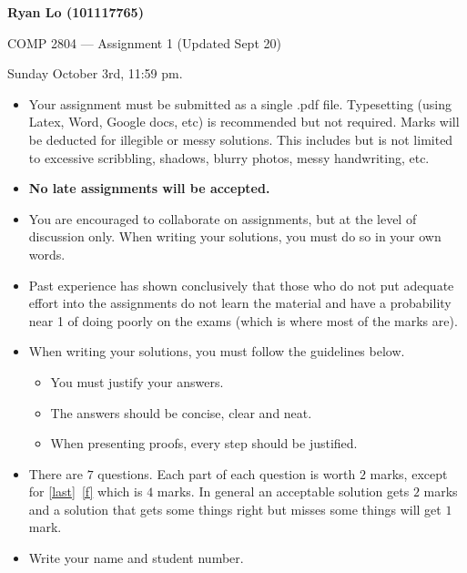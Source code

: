 \documentclass[12pt]{article}
\newcounter{ques}
\newenvironment{question}{\refstepcounter{ques}{\noindent\bf Question \arabic{ques}:}}{\vspace{5mm}}
\begin{document}
 

\begin{center} \Large\bf
Ryan Lo (101117765)

COMP 2804 --- Assignment 1 (Updated Sept 20)
\end{center} 

 Sunday October 3rd, 11:59 pm. 

\vspace{0.5em} 

\begin{itemize}
\item Your assignment must be submitted as a single .pdf file. Typesetting (using Latex, Word, Google docs, etc) is recommended but not required. Marks will be deducted for illegible or messy solutions. This includes but is not limited to excessive scribbling, shadows, blurry photos, messy handwriting, etc.   
\item {\bf No late assignments will be accepted. } 
\item You are encouraged to collaborate on assignments, but at the level 
      of discussion only. When writing your solutions, you must do so 
      in your own words. 
\item Past experience has shown conclusively that those who do not put 
      adequate effort into the assignments do not learn the material and have a probability near 1 of doing poorly on the exams (which is where most of the marks are).
\item When writing your solutions, you must follow the guidelines below.
      \begin{itemize}
      \item You must justify your answers. 
      \item The answers should be concise, clear and neat.
      \item When presenting proofs, every step should be justified.
      \end{itemize}
\item There are $7$ questions. Each part of each question is worth $2$ marks, except for \ref{last}~\ref{f} which is $4$ marks. In general an acceptable solution gets $2$ marks and a solution that gets some things right but misses some things will get $1$ mark.
\end{itemize}

\vspace{1em} 


\begin{question} 
\begin{itemize}
\item Write your name and student number. 
\end{itemize}
\end{question} 
\end{document}
